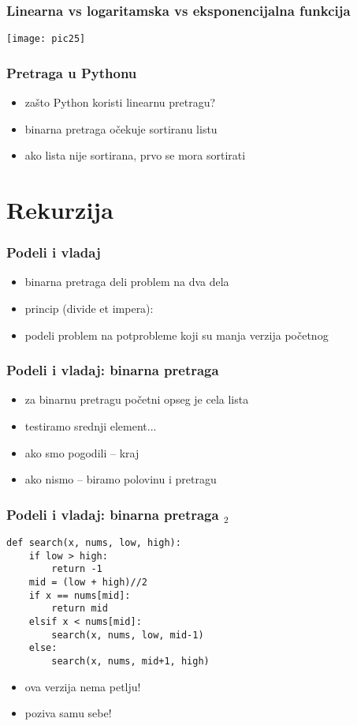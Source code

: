 \documentclass[utf8,compress,aspectratio=169]{beamer}
\begin{document}
\begin{frame}[fragile]
  \frametitle{Linearna vs logaritamska vs eksponencijalna funkcija}
  \begin{center}
    \texttt{[image: pic25]}
  \end{center}
\end{frame}

\begin{frame}[fragile]
  \frametitle{Pretraga u Pythonu}
  \begin{itemize}
    \item zašto Python koristi linearnu pretragu?
    \item binarna pretraga očekuje sortiranu listu
    \item ako lista nije sortirana, prvo se mora sortirati
  \end{itemize}
\end{frame}

\section[Rekurzija]{Rekurzija}

\begin{frame}[fragile]
  \frametitle{Podeli i vladaj}
  \begin{itemize}
    \item binarna pretraga deli problem na dva dela
    \item princip  (divide et impera):
    \item podeli problem na potprobleme koji su manja verzija početnog
  \end{itemize}
\end{frame}

\begin{frame}[fragile]
  \frametitle{Podeli i vladaj: binarna pretraga}
  \begin{itemize}
    \item za binarnu pretragu početni opseg je cela lista
    \item testiramo srednji element...
    \item ako smo pogodili -- kraj
    \item ako nismo -- biramo polovinu i  pretragu
  \end{itemize}
\end{frame}

\begin{frame}[fragile]
  \frametitle{Podeli i vladaj: binarna pretraga $_2$}
\begin{verbatim}
def search(x, nums, low, high):
    if low > high:
        return -1
    mid = (low + high)//2
    if x == nums[mid]:
        return mid
    elsif x < nums[mid]:
        search(x, nums, low, mid-1)
    else:
        search(x, nums, mid+1, high)
\end{verbatim}
  \begin{itemize}
    \item ova verzija nema petlju!
    \item poziva samu sebe!
  \end{itemize}
\end{frame}
\end{document}
